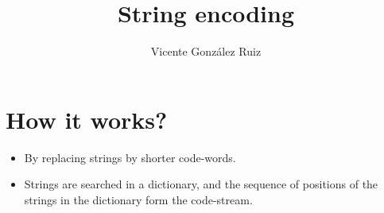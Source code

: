 
\title{String encoding}

\author{Vicente González Ruiz}

\maketitle

\section{How it works?}

\begin{itemize}
\item By replacing strings by shorter code-words.
\item Strings are searched in a dictionary, and the sequence of positions of the strings in the dictionary form the code-stream.
\end{itemize}
